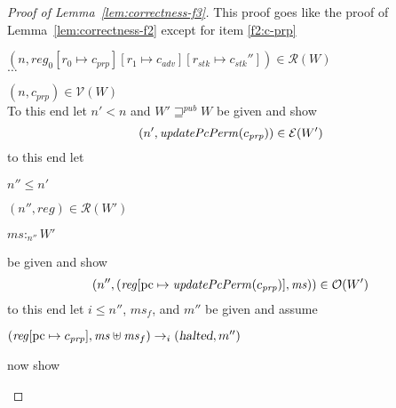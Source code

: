 \documentclass[a4paper]{article}
\newcommand{\update}[2]{[#1 \mapsto #2]}
\newcommand{\var}[1]{\mathit{#1}}
\newcommand{\hs}{\var{ms}}
\newcommand{\ms}{\hs}
\newcommand{\pcreg}{\mathrm{pc}}
\newcommand{\reg}{\var{reg}}
\newcommand{\heap}{\var{mem}}
\newcommand{\adv}{\var{adv}}
\newcommand{\stk}{\var{stk}}
\newcommand{\prp}{\var{prp}}
\newcommand{\halted}{\textsl{halted}}
\newcommand{\plainfun}[2]{
  \ifthenelse{\equal{#2}{}}
  {\mathit{#1}}
  {\mathit{#1}(#2)}
}
\newcommand{\updatePcPerm}[1]{\plainfun{updatePcPerm}{#1}}
\newcommand{\futurewk}{\mathbin{\sqsupseteq}^{\var{pub}}}
\newcommand{\heapSat}[3][\heap]{#1 :_{#2} #3}
\newcommand{\asmType}{\plaindom{AsmType}}
\newcommand{\plaindom}[1]{\mathrm{#1}}
\newcommand{\intr}[2]{\mathcal{#1}}
\newcommand{\valueintr}[1]{\intr{V}{#1}}
\newcommand{\exprintr}[1]{\intr{E}{#1}}
\newcommand{\regintr}[1]{\intr{R}{#1}}
\newcommand{\stdvr}{\valueintr{\asmType}}
\newcommand{\stder}{\exprintr{\asmType}}
\newcommand{\stdrr}{\regintr{\asmType}}
\newcommand{\observations}{\mathcal{O}}
\newcommand{\npair}[2][n]{\left(#1,#2 \right)}
\newcommand{\step}[1][]{\rightarrow_{#1}}
\begin{document}
\begin{proof}[Proof of Lemma~\ref{lem:correctness-f3}]
  This proof goes like the proof of Lemma~\ref{lem:correctness-f2} except for item \ref{f2:c-prp}
  \begin{enumproof}[start=3]
  \item $\npair{\reg_0\update{r_0}{c_{\var{prp}}}\update{r_1}{c_\adv}\update{r_\stk}{c_\stk''}} \in \stdrr(W)$ \\
    $\dots$
    \begin{enumproof}[start=3]
    \item $\npair{c_{\var{prp}}} \in \stdvr(W)$ \\
      To this end let $n' < n$ and $W' \futurewk W$ be given and show
      \[
        \npair[n']{\updatePcPerm{c_\prp}} \in \stder(W')
      \]
      to this end let 
      \begin{enumproof}
      \item $n'' \leq n'$
      \item $\npair[n'']{\reg} \in \stdrr(W')$
      \item $\heapSat[\ms]{n''}{W'}$ \label{f3:mem-sat-mid}
      \end{enumproof}
      be given and show
      \[
        \npair[n'']{(\reg\update{\pcreg}{\updatePcPerm{c_\prp}},\ms)} \in \observations(W')
      \]
      to this end let $i \leq n''$, $\ms_f$, and $m''$ be given and assume
      \begin{enumproof}[resume]
      \item $(\reg\update{\pcreg}{c_\prp},\ms \uplus \ms_f) \step[i] (\halted,m'')$ \label{f3:mid-exec}
      \end{enumproof}
      now show


\end{enumproof}
\end{enumproof}
\end{proof}
\end{document}
